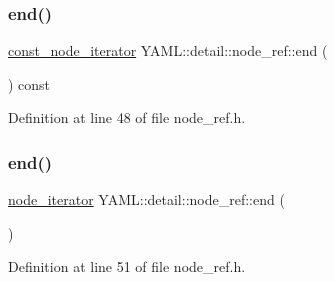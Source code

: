 \subsubsection{\texorpdfstring{end()}{end()}\hspace{0.1cm}{\footnotesize\ttfamily [1/2]}}
{\footnotesize\ttfamily \mbox{\hyperlink{namespace_y_a_m_l_1_1detail_a049af8e269401cbe1e735033914e4356}{const\+\_\+node\+\_\+iterator}} Y\+A\+M\+L\+::detail\+::node\+\_\+ref\+::end (\begin{DoxyParamCaption}{ }\end{DoxyParamCaption}) const\hspace{0.3cm}{\ttfamily [inline]}}



Definition at line 48 of file node\+\_\+ref.\+h.

\mbox{\label{class_y_a_m_l_1_1detail_1_1node__ref_ae0e43a1e8678e46549cc2624f9ce5557}} 
\subsubsection{\texorpdfstring{end()}{end()}\hspace{0.1cm}{\footnotesize\ttfamily [2/2]}}
{\footnotesize\ttfamily \mbox{\hyperlink{namespace_y_a_m_l_1_1detail_aa2a961156810d41a3b6744c10186afac}{node\+\_\+iterator}} Y\+A\+M\+L\+::detail\+::node\+\_\+ref\+::end (\begin{DoxyParamCaption}{ }\end{DoxyParamCaption})\hspace{0.3cm}{\ttfamily [inline]}}



Definition at line 51 of file node\+\_\+ref.\+h.

\mbox{\label{class_y_a_m_l_1_1detail_1_1node__ref_a9ad0d590aefef1f9155ae00417cf43b4}} 
